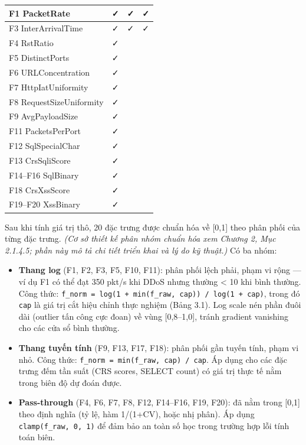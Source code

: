 \documentclass[12pt,a4paper,twoside]{report}
\begin{document}
{{\begin{tabular}{p{2.5cm}p{2.5cm}p{2.5cm}p{2.5cm}}
\hline
F1 PacketRate & ✓ & ✓ & ✓ \\
\hline
F3 InterArrivalTime & ✓ & ✓ & ✓ \\
F4 RstRatio & ✓ \\
F5 DistinctPorts & ✓ \\
F6 URLConcentration & ✓ \\
F7 HttpIatUniformity & ✓ \\
F8 RequestSizeUniformity & ✓ \\
F9 AvgPayloadSize & ✓ \\
F11 PacketsPerPort & ✓ \\
F12 SqlSpecialChar & ✓ \\
F13 CrsSqliScore & ✓ \\
F14–F16 SqlBinary & ✓ \\
F18 CrsXssScore & ✓ \\
F19–F20 XssBinary & ✓ \\
\hline
\end{tabular}

Sau khi tính giá trị thô, 20 đặc trưng được chuẩn hóa về [0,1] theo phân phối của từng đặc trưng. \textit{(Cơ sở thiết kế phân nhóm chuẩn hóa xem Chương 2, Mục 2.1.4.5; phần này mô tả chi tiết triển khai và lý do kỹ thuật.)} Có ba nhóm:

\begin{itemize}
\item \textbf{Thang log} (F1, F2, F3, F5, F10, F11): phân phối lệch phải, phạm vi rộng — ví dụ F1 có thể đạt 350 pkt/s khi DDoS nhưng thường < 10 khi bình thường. Công thức: \texttt{f_norm = log(1 + min(f_raw, cap)) / log(1 + cap)}, trong đó \texttt{cap} là giá trị cắt hiệu chỉnh thực nghiệm (Bảng 3.1). Log scale nén phần đuôi dài (outlier tấn công cực đoan) về vùng [0,8–1,0], tránh gradient vanishing cho các cửa sổ bình thường.
\item \textbf{Thang tuyến tính} (F9, F13, F17, F18): phân phối gần tuyến tính, phạm vi nhỏ. Công thức: \texttt{f_norm = min(f_raw, cap) / cap}. Áp dụng cho các đặc trưng đếm tần suất (CRS scores, SELECT count) có giá trị thực tế nằm trong biên độ dự đoán được.
\item \textbf{Pass-through} (F4, F6, F7, F8, F12, F14–F16, F19, F20): đã nằm trong [0,1] theo định nghĩa (tỷ lệ, hàm 1/(1+CV), hoặc nhị phân). Áp dụng \texttt{clamp(f_raw, 0, 1)} để đảm bảo an toàn số học trong trường hợp lỗi tính toán biên.
\end{itemize}

}}
\end{document}
